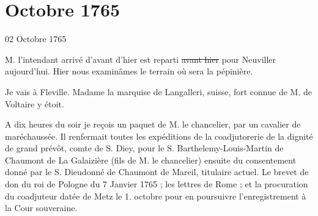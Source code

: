                   \chapter*{Octobre 1765}


                     \begin{diary}{02 Octobre 1765}{}


                           M. l'intendant arrivé d'avant d'hier est
                           reparti
                           \sout{avant hier} pour Neuviller aujourd'hui.
                           Hier nous examinâmes le terrain où
                           sera
                           la pépinière. \bigskip


                         Je vais à Fleville. Madame la marquise de
                              Langalleri, suisse, fort connue de M. de
                              Voltaire y étoit. \bigskip


                         A dix heures du soir je reçois un
                           paquet
                           de M. le chancelier, par un
                           cavalier
                           de maréchaussée. Il renfermait toutes les
                           expéditions de la coadjutorerie de la dignité
                           de grand prévôt,
                           comte de S. Diey, pour le S.
                              Barthelemy-Louis-Martin de Chaumont de
                              La Galaizière (fils de M. le chancelier) ensuite
                           du consentement donné par le S. Dieudonné
                              de Chaumont de Mareil, titulaire actuel.
                           Le brevet de don du roi de
                              Pologne
                           du
                              7 Janvier 1765  ; les lettres de Rome  ; et la
                           procuration du coadjuteur datée de Metz
                           le 1.
                              octobre pour en poursuivre l'enregistrement
                           à la Cour souveraine. \bigskip


                     \end{diary}

